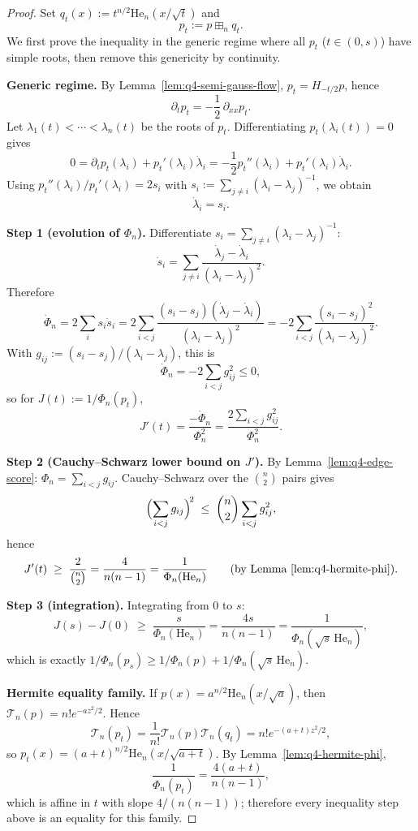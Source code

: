 \begin{proof}
Set $q_t(x):=t^{n/2}\mathrm{He}_n(x/\sqrt t)$ and
\[
p_t:=p\boxplus_n q_t.
\]
We first prove the inequality in the generic regime where all $p_t$ ($t\in(0,s)$)
have simple roots, then remove this genericity by continuity.

\textbf{Generic regime.}
By Lemma~\ref{lem:q4-semi-gauss-flow}, $p_t=H_{-t/2}p$, hence
\[
\partial_t p_t=-\frac12\,\partial_{xx}p_t.
\]
Let $\lambda_1(t)<\cdots<\lambda_n(t)$ be the roots of $p_t$.
Differentiating $p_t(\lambda_i(t))=0$ gives
\[
0=\partial_t p_t(\lambda_i)+p_t'(\lambda_i)\dot\lambda_i
=-\frac12 p_t''(\lambda_i)+p_t'(\lambda_i)\dot\lambda_i.
\]
Using $p_t''(\lambda_i)/p_t'(\lambda_i)=2s_i$ with
$s_i:=\sum_{j\neq i}(\lambda_i-\lambda_j)^{-1}$, we obtain
\[
\dot\lambda_i=s_i.
\]

\textbf{Step 1 (evolution of $\Phi_n$).}
Differentiate $s_i=\sum_{j\neq i}(\lambda_i-\lambda_j)^{-1}$:
\[
\dot s_i=\sum_{j\neq i}\frac{\dot\lambda_j-\dot\lambda_i}{(\lambda_i-\lambda_j)^2}.
\]
Therefore
\[
\dot\Phi_n
=2\sum_i s_i\dot s_i
=2\sum_{i<j}\frac{(s_i-s_j)(\dot\lambda_j-\dot\lambda_i)}{(\lambda_i-\lambda_j)^2}
=-2\sum_{i<j}\frac{(s_i-s_j)^2}{(\lambda_i-\lambda_j)^2}.
\]
With $g_{ij}:=(s_i-s_j)/(\lambda_i-\lambda_j)$, this is
\[
\dot\Phi_n=-2\sum_{i<j}g_{ij}^2\le 0,
\]
so for $J(t):=1/\Phi_n(p_t)$,
\[
J'(t)=\frac{-\dot\Phi_n}{\Phi_n^2}
=\frac{2\sum_{i<j}g_{ij}^2}{\Phi_n^2}.
\]

\textbf{Step 2 (Cauchy--Schwarz lower bound on $J'$).}
By Lemma~\ref{lem:q4-edge-score}: $\Phi_n=\sum_{i<j}g_{ij}$.
Cauchy--Schwarz over the $\binom{n}{2}$ pairs gives
\[
\Bigl(\sum_{i<j}g_{ij}\Bigr)^{\!2}
\;\le\; \binom{n}{2}\sum_{i<j}g_{ij}^2,
\]
hence
\[
J'(t)
\;\ge\; \frac{2}{\binom{n}{2}}
= \frac{4}{n(n-1)}
= \frac{1}{\Phi_n(\mathrm{He}_n)}
\qquad\text{(by Lemma~\ref{lem:q4-hermite-phi})}.
\]

\textbf{Step 3 (integration).}
Integrating from $0$ to $s$:
\[
J(s)-J(0)
\;\ge\; \frac{s}{\Phi_n(\mathrm{He}_n)}
= \frac{4s}{n(n-1)}
= \frac{1}{\Phi_n(\sqrt{s}\,\mathrm{He}_n)},
\]
which is exactly $1/\Phi_n(p_s)\ge 1/\Phi_n(p)+1/\Phi_n(\sqrt{s}\,\mathrm{He}_n)$.

\textbf{Hermite equality family.}
If $p(x)=a^{n/2}\mathrm{He}_n(x/\sqrt a)$, then
$\mathcal T_n(p)=n!e^{-a z^2/2}$.
Hence
\[
\mathcal T_n(p_t)=\frac1{n!}\mathcal T_n(p)\mathcal T_n(q_t)
=n!e^{-(a+t)z^2/2},
\]
so $p_t(x)=(a+t)^{n/2}\mathrm{He}_n(x/\sqrt{a+t})$.
By Lemma~\ref{lem:q4-hermite-phi},
\[
\frac{1}{\Phi_n(p_t)}=\frac{4(a+t)}{n(n-1)},
\]
which is affine in $t$ with slope $4/(n(n-1))$; therefore every inequality
step above is an equality for this family.


\end{proof}
